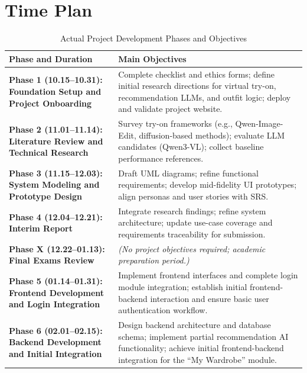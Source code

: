 \chapter{Time Plan}
\label{ch:timeline}

\begin{table}[H]
\small
\setlength{\tabcolsep}{8pt}
\renewcommand{\arraystretch}{1.5}
\centering
\caption{Actual Project Development Phases and Objectives}
\label{tab:project_phases}
\begin{tabularx}{\textwidth}{@{}p{} X@{}}
\toprule
\textbf{Phase and Duration} & \textbf{Main Objectives} \\
\midrule

\textbf{Phase 1 (10.15--10.31): Foundation Setup and Project Onboarding} &
Complete checklist and ethics forms; define initial research directions for virtual try-on, recommendation LLMs, and outfit logic; deploy and validate project website. \\

\textbf{Phase 2 (11.01--11.14): Literature Review and Technical Research} &
Survey try-on frameworks (e.g., Qwen-Image-Edit, diffusion-based methods); evaluate LLM candidates (Qwen3-VL); collect baseline performance references. \\

\textbf{Phase 3 (11.15--12.03): System Modeling and Prototype Design} &
Draft UML diagrams; refine functional requirements; develop mid-fidelity UI prototypes; align personas and user stories with SRS. \\

\textbf{Phase 4 (12.04--12.21): Interim Report} &
Integrate research findings; refine system architecture; update use-case coverage and requirements traceability for submission. \\

\textbf{Phase X (12.22--01.13): Final Exams Review} &
\textit{(No project objectives required; academic preparation period.)} \\

\textbf{Phase 5 (01.14--01.31): Frontend Development and Login Integration} &
Implement frontend interfaces and complete login module integration; establish initial frontend-backend interaction and ensure basic user authentication workflow. \\

\textbf{Phase 6 (02.01--02.15): Backend Development and Initial Integration} &
Design backend architecture and database schema; implement partial recommendation AI functionality; achieve initial frontend-backend integration for the “My Wardrobe” module. \\


\end{tabularx}
\end{table}
